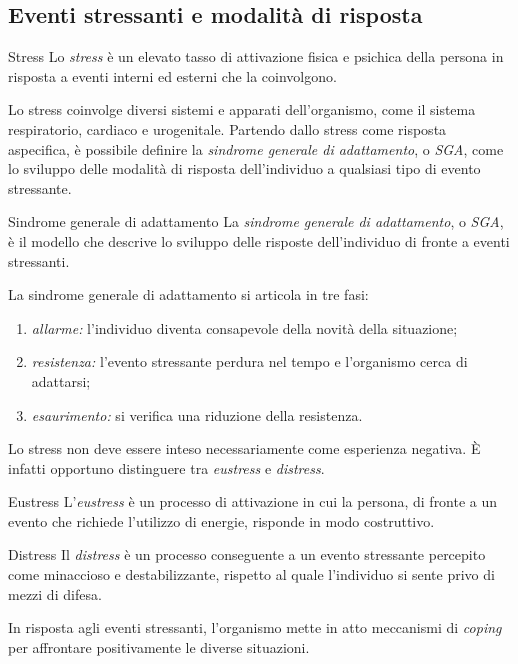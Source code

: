 \documentclass[a4paper]{article}
\begin{document}
\subsection{Eventi stressanti e modalità di risposta}
\begin{snippetdefinition}{Stress}
    Lo \emph{stress} è un elevato tasso di attivazione fisica e psichica della persona in risposta a eventi interni ed esterni che la coinvolgono.
\end{snippetdefinition}
Lo stress coinvolge diversi sistemi e apparati dell'organismo, come il sistema respiratorio, cardiaco e urogenitale.
Partendo dallo stress come risposta aspecifica, è possibile definire la \emph{sindrome generale di adattamento}, o \emph{SGA}, come lo sviluppo delle modalità di risposta dell'individuo a qualsiasi tipo di evento stressante.
\begin{snippetdefinition}{Sindrome generale di adattamento}
    La \emph{sindrome generale di adattamento}, o \emph{SGA}, è il modello che descrive lo sviluppo delle risposte dell'individuo di fronte a eventi stressanti.
\end{snippetdefinition}
La sindrome generale di adattamento si articola in tre fasi:
\begin{enumerate}
    \item \emph{allarme:} l'individuo diventa consapevole della novità della situazione;
    \item \emph{resistenza:} l'evento stressante perdura nel tempo e l'organismo cerca di adattarsi;
    \item \emph{esaurimento:} si verifica una riduzione della resistenza.
\end{enumerate}
Lo stress non deve essere inteso necessariamente come esperienza negativa. È infatti opportuno distinguere tra \emph{eustress} e \emph{distress}.
\begin{snippetdefinition}{Eustress}
    L'\emph{eustress} è un processo di attivazione in cui la persona, di fronte a un evento che richiede l'utilizzo di energie, risponde in modo costruttivo.
\end{snippetdefinition}
\begin{snippetdefinition}{Distress}
    Il \emph{distress} è un processo conseguente a un evento stressante percepito come minaccioso e destabilizzante, rispetto al quale l'individuo si sente privo di mezzi di difesa.
\end{snippetdefinition}
In risposta agli eventi stressanti, l'organismo mette in atto meccanismi di \emph{coping} per affrontare positivamente le diverse situazioni.
\end{document}
